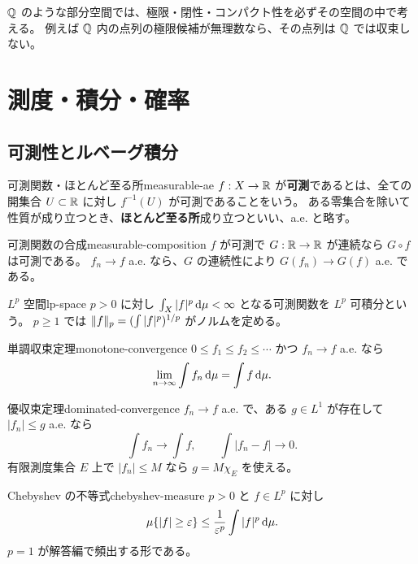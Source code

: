 \begin{memo*}
$\mathbb{Q}$ のような部分空間では、極限・閉性・コンパクト性を必ずその空間の中で考える。
例えば $\mathbb{Q}$ 内の点列の極限候補が無理数なら、その点列は $\mathbb{Q}$ では収束しない。
\end{memo*}

\chapter{測度・積分・確率}
\label{ch:measure-probability}

\section{可測性とルベーグ積分}

\begin{definition}{可測関数・ほとんど至る所}{measurable-ae}
$f:X\to\mathbb{R}$ が\textbf{可測}であるとは、全ての開集合 $U\subset\mathbb{R}$ に対し $f^{-1}(U)$ が可測であることをいう。
ある零集合を除いて性質が成り立つとき、\textbf{ほとんど至る所}成り立つといい、a.e. と略す。
\end{definition}

\begin{proposition}{可測関数の合成}{measurable-composition}
$f$ が可測で $G:\mathbb{R}\to\mathbb{R}$ が連続なら $G\circ f$ は可測である。
$f_n\to f$ a.e. なら、$G$ の連続性により $G(f_n)\to G(f)$ a.e. である。
\end{proposition}

\begin{definition}{$L^p$ 空間}{lp-space}
$p>0$ に対し $\int_X|f|^p\,\mathrm{d}\mu<\infty$ となる可測関数を $L^p$ 可積分という。
$p\ge1$ では $\lVert f \rVert_p=(\int|f|^p)^{1/p}$ がノルムを定める。
\end{definition}

\begin{theorem}{単調収束定理}{monotone-convergence}
$0\le f_1\le f_2\le\cdots$ かつ $f_n\to f$ a.e. なら
\[
  \lim_{n\to\infty}\int f_n\,\mathrm{d}\mu=\int f\,\mathrm{d}\mu.
\]
\end{theorem}

\begin{theorem}{優収束定理}{dominated-convergence}
$f_n\to f$ a.e. で、ある $g\in L^1$ が存在して $|f_n|\le g$ a.e. なら
\[
 \int f_n\to\int f,
 \qquad \int|f_n-f|\to0.
\]
有限測度集合 $E$ 上で $|f_n|\le M$ なら $g=M\chi_E$ を使える。
\end{theorem}

\begin{theorem}{Chebyshev の不等式}{chebyshev-measure}
$p>0$ と $f\in L^p$ に対し
\[
 \mu\{|f|\ge\varepsilon\}\le
 \frac1{\varepsilon^p}\int|f|^p\,\mathrm{d}\mu.
\]
$p=1$ が解答編で頻出する形である。
\end{theorem}

